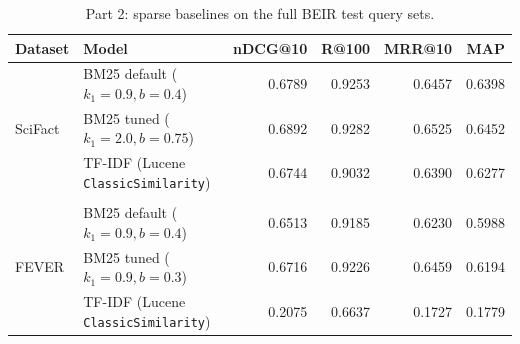 \begin{table}[ht]\centering\small
\begin{tabular}{llrrrr}\toprule
Dataset & Model & nDCG@10 & R@100 & MRR@10 & MAP \\ \midrule
\multirow{3}{*}{SciFact} & BM25 default ($k_1{=}0.9, b{=}0.4$) & 0.6789 & 0.9253 & 0.6457 & 0.6398 \\
 & BM25 tuned ($k_1{=}2.0, b{=}0.75$) & 0.6892 & 0.9282 & 0.6525 & 0.6452 \\
 & TF-IDF (Lucene \texttt{ClassicSimilarity}) & 0.6744 & 0.9032 & 0.6390 & 0.6277 \\
\midrule \\
\multirow{3}{*}{FEVER} & BM25 default ($k_1{=}0.9, b{=}0.4$) & 0.6513 & 0.9185 & 0.6230 & 0.5988 \\
 & BM25 tuned ($k_1{=}0.9, b{=}0.3$) & 0.6716 & 0.9226 & 0.6459 & 0.6194 \\
 & TF-IDF (Lucene \texttt{ClassicSimilarity}) & 0.2075 & 0.6637 & 0.1727 & 0.1779 \\
\bottomrule\end{tabular}
\caption{Part 2: sparse baselines on the full BEIR test query sets.}\label{tab:part2}\end{table}
